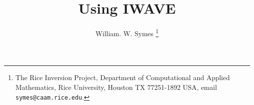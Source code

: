 
\title{Using IWAVE}
\author{William. W. Symes \thanks{The Rice Inversion Project,
Department of Computational and Applied Mathematics, Rice University,
Houston TX 77251-1892 USA, email {\tt symes@caam.rice.edu}.}}

\maketitle






